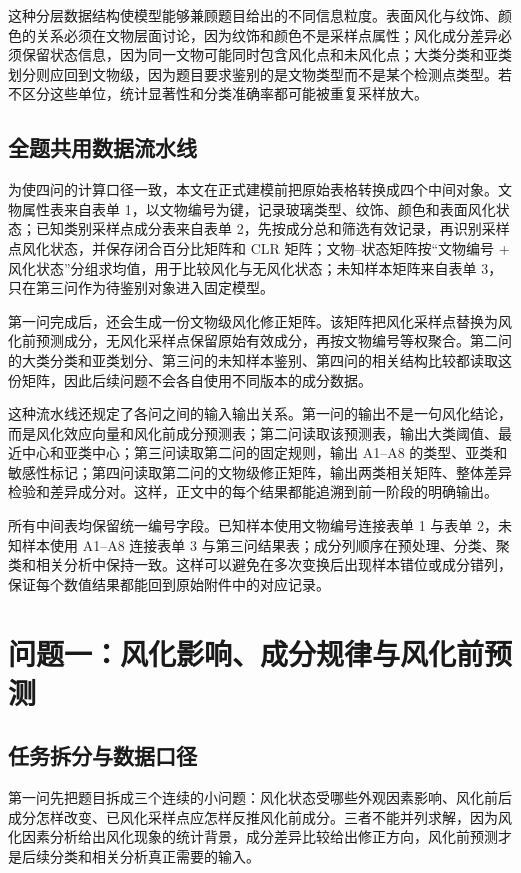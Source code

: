 \documentclass[UTF8,zihao=-4,a4paper,fontset=fandol]{ctexart}
\begin{document}
这种分层数据结构使模型能够兼顾题目给出的不同信息粒度。表面风化与纹饰、颜色的关系必须在文物层面讨论，因为纹饰和颜色不是采样点属性；风化成分差异必须保留状态信息，因为同一文物可能同时包含风化点和未风化点；大类分类和亚类划分则应回到文物级，因为题目要求鉴别的是文物类型而不是某个检测点类型。若不区分这些单位，统计显著性和分类准确率都可能被重复采样放大。

\subsection{全题共用数据流水线}

为使四问的计算口径一致，本文在正式建模前把原始表格转换成四个中间对象。文物属性表来自表单 1，以文物编号为键，记录玻璃类型、纹饰、颜色和表面风化状态；已知类别采样点成分表来自表单 2，先按成分总和筛选有效记录，再识别采样点风化状态，并保存闭合百分比矩阵和 CLR 矩阵；文物--状态矩阵按“文物编号 + 风化状态”分组求均值，用于比较风化与无风化状态；未知样本矩阵来自表单 3，只在第三问作为待鉴别对象进入固定模型。

第一问完成后，还会生成一份文物级风化修正矩阵。该矩阵把风化采样点替换为风化前预测成分，无风化采样点保留原始有效成分，再按文物编号等权聚合。第二问的大类分类和亚类划分、第三问的未知样本鉴别、第四问的相关结构比较都读取这份矩阵，因此后续问题不会各自使用不同版本的成分数据。

这种流水线还规定了各问之间的输入输出关系。第一问的输出不是一句风化结论，而是风化效应向量和风化前成分预测表；第二问读取该预测表，输出大类阈值、最近中心和亚类中心；第三问读取第二问的固定规则，输出 A1--A8 的类型、亚类和敏感性标记；第四问读取第二问的文物级修正矩阵，输出两类相关矩阵、整体差异检验和差异成分对。这样，正文中的每个结果都能追溯到前一阶段的明确输出。

所有中间表均保留统一编号字段。已知样本使用文物编号连接表单 1 与表单 2，未知样本使用 A1--A8 连接表单 3 与第三问结果表；成分列顺序在预处理、分类、聚类和相关分析中保持一致。这样可以避免在多次变换后出现样本错位或成分错列，保证每个数值结果都能回到原始附件中的对应记录。

\section{问题一：风化影响、成分规律与风化前预测}

\subsection{任务拆分与数据口径}

第一问先把题目拆成三个连续的小问题：风化状态受哪些外观因素影响、风化前后成分怎样改变、已风化采样点应怎样反推风化前成分。三者不能并列求解，因为风化因素分析给出风化现象的统计背景，成分差异比较给出修正方向，风化前预测才是后续分类和相关分析真正需要的输入。
\end{document}
